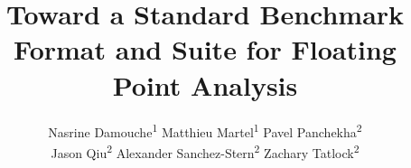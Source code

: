 \documentclass{llncs}
\begin{document}
\title{Toward a Standard Benchmark Format and Suite for Floating Point Analysis}
\author{
  Nasrine Damouche\textsuperscript{1} \hspace{0.1in}
  Matthieu Martel\textsuperscript{1} \hspace{0.1in}
  Pavel Panchekha\textsuperscript{2} \\
  Jason Qiu\textsuperscript{2} \hspace{0.1in}
  Alexander Sanchez-Stern\textsuperscript{2} \hspace{0.1in}
  Zachary Tatlock\textsuperscript{2}
}
\maketitle






%






\end{document}
